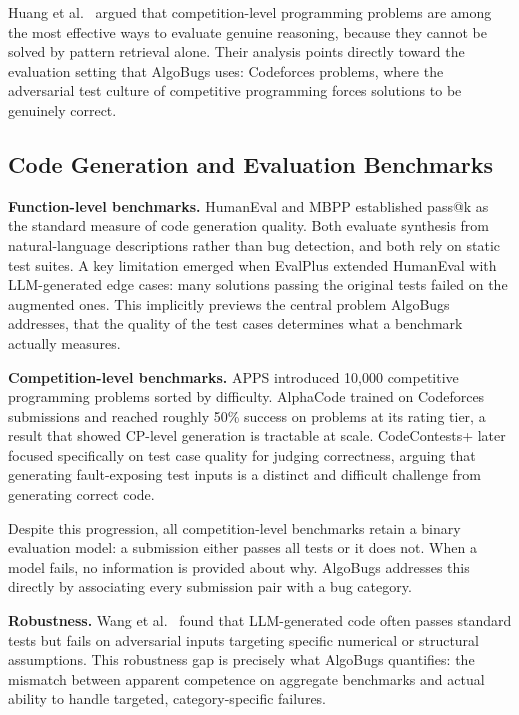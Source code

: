 Huang et al.\ \cite{huang2024competition} argued that competition-level programming problems are among the most effective ways to evaluate genuine reasoning, because they cannot be solved by pattern retrieval alone. Their analysis points directly toward the evaluation setting that AlgoBugs uses: Codeforces problems, where the adversarial test culture of competitive programming forces solutions to be genuinely correct.

\subsection{Code Generation and Evaluation Benchmarks}

\textbf{Function-level benchmarks.} HumanEval \cite{chen2021evaluating} and MBPP established pass@k as the standard measure of code generation quality. Both evaluate synthesis from natural-language descriptions rather than bug detection, and both rely on static test suites. A key limitation emerged when EvalPlus extended HumanEval with LLM-generated edge cases: many solutions passing the original tests failed on the augmented ones. This implicitly previews the central problem AlgoBugs addresses, that the quality of the test cases determines what a benchmark actually measures.

\textbf{Competition-level benchmarks.} APPS \cite{hendrycks2021apps} introduced 10,000 competitive programming problems sorted by difficulty. AlphaCode \cite{li2022competition} trained on Codeforces submissions and reached roughly 50\% success on problems at its rating tier, a result that showed CP-level generation is tractable at scale. CodeContests+ \cite{wang2025codecontests} later focused specifically on test case quality for judging correctness, arguing that generating fault-exposing test inputs is a distinct and difficult challenge from generating correct code.

Despite this progression, all competition-level benchmarks retain a binary evaluation model: a submission either passes all tests or it does not. When a model fails, no information is provided about why. AlgoBugs addresses this directly by associating every submission pair with a bug category.

\textbf{Robustness.} Wang et al.\ \cite{wang2025robustness} found that LLM-generated code often passes standard tests but fails on adversarial inputs targeting specific numerical or structural assumptions. This robustness gap is precisely what AlgoBugs quantifies: the mismatch between apparent competence on aggregate benchmarks and actual ability to handle targeted, category-specific failures.

